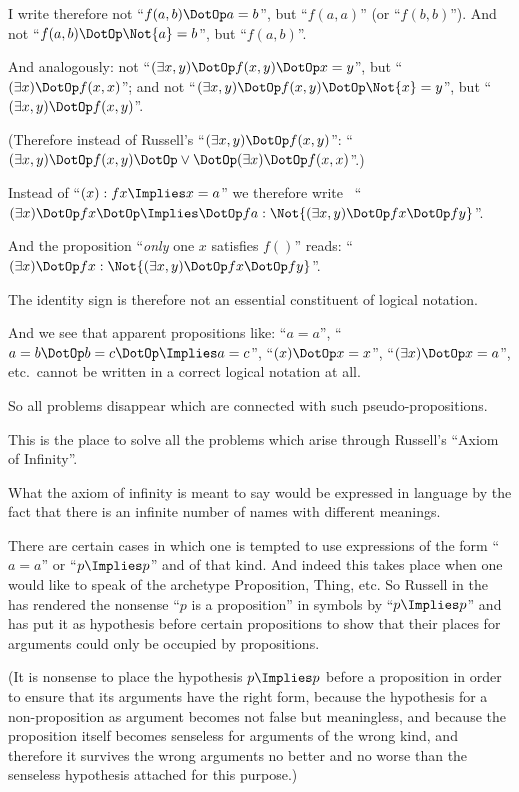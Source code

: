 {I write therefore not ``$f(a,b) \DotOp a = b$'', but ``$f(a,a)$''
(or ``$f(b,b)$''). And not ``$f(a,b) \DotOp \Not{a} = b$'', but
``$f(a,b)$''.}


{And analogously: not ``$(\exists x,y) \DotOp f(x,y) \DotOp x = y$'',
but ``$(\exists x) \DotOp f(x,x)$''; and not ``$(\exists x,y) \DotOp f(x,y) \DotOp
\Not{x} = y$'', but ``$(\exists x,y) \DotOp f(x,y)$''.

(Therefore instead of Russell's ``$(\exists x,y) \DotOp f(x,y)$'':
``$(\exists x,y) \DotOp f(x,y) \DotOp \lor \DotOp (\exists x) \DotOp f(x,x)$''.)}


{Instead of ``$(x) : fx \Implies x = a$'' we therefore write
\exempliGratia\ ``$(\exists x) \DotOp fx \DotOp \Implies \DotOp fa : \Not{(\exists x,y) \DotOp fx \DotOp fy}$''.

And the proposition ``\emph{only} one $x$ satisfies $f()$''
reads: ``$(\exists x) \DotOp fx : \Not{(\exists x,y) \DotOp fx \DotOp fy}$''.}


{The identity sign is therefore not an essential
constituent of logical notation.}


{And we see that apparent propositions like:
``$a = a$'', ``$a = b \DotOp b = c \DotOp \Implies a = c$'', ``$(x) \DotOp x = x$'', ``$(\exists x) \DotOp
x = a$'', etc.\ cannot be written in a correct logical
notation at all.}


{So all problems disappear which are connected
with such pseu\-do-prop\-o\-si\-tions.

This is the place to solve all the problems which
arise through Russell's ``Axiom of Infinity''.

What the axiom of infinity is meant to say
would be expressed in language by the fact that
there is an infinite number of names with different
meanings.}


{There are certain cases in which one is tempted
to use expressions of the form ``$a = a$'' or ``$p \Implies p$''
and of that kind. And indeed this takes place
when one would like to speak of the archetype
Proposition, Thing, etc. So Russell in the  has rendered the nonsense ``$p$
is a proposition'' in symbols by ``$p \Implies p$'' and has
put it as hypothesis before certain propositions to
show that their places for arguments could only
be occupied by propositions.

(It is nonsense to place the hypothesis $p \Implies p$
before a proposition in order to ensure that its
arguments have the right form, because the
hypothesis for a non-proposition as argument
becomes not false but meaningless, and because
the proposition itself becomes senseless for arguments
of the wrong kind, and therefore it survives
the wrong arguments no better and no worse
than the senseless hypothesis attached for this
purpose.)}


